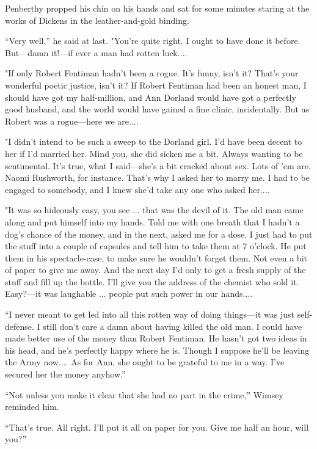 Penberthy propped his chin on his hands and sat for some minutes staring at the works of Dickens in the leather-and-gold binding.

\enquote{Very well,} he said at last. "You're quite right. I ought to have done it before. But\allowbreak---\allowbreak damn it!---if ever a man had rotten luck....

"If only Robert Fentiman hadn't been a rogue. It's funny, isn't it? That's your wonderful poetic justice, isn't it? If Robert Fentiman had been an honest man, I should have got my half-million, and Ann Dorland would have got a perfectly good husband, and the world would have gained a fine clinic, incidentally. But as Robert was a rogue\allowbreak---\allowbreak here we are....

"I didn't intend to be such a sweep to the Dorland girl. I'd have been decent to her if I'd married her. Mind you, she did sicken me a bit. Always wanting to be sentimental. It's true, what I said\allowbreak---\allowbreak she's a bit cracked about sex. Lots of 'em are. Naomi Rushworth, for instance. That's why I asked her to marry me. I had to be engaged to somebody, and I knew she'd take any one who asked her....

"It was so hideously easy, you see ... that was the devil of it. The old man came along and put himself into my hands. Told me with one breath that I hadn't a dog's chance of the money, and in the next, asked me for a dose. I just had to put the stuff into a couple of capsules and tell him to take them at 7 o'clock. He put them in his spectacle-case, to make sure he wouldn't forget them. Not even a bit of paper to give me away. And the next day I'd only to get a fresh supply of the stuff and fill up the bottle. I'll give you the address of the chemist who sold it. Easy?---it was laughable ... people put such power in our hands....

\enquote{I never meant to get led into all this rotten way of doing things\allowbreak---\allowbreak it was just self-defense. I still don't care a damn about having killed the old man. I could have made better use of the money than Robert Fentiman. He hasn't got two ideas in his head, and he's perfectly happy where he is. Though I suppose he'll be leaving the Army now.... As for Ann, she ought to be grateful to me in a way. I've secured her the money anyhow.}

\enquote{Not unless you make it clear that she had no part in the crime,} Wimsey reminded him.

\enquote{That's true. All right. I'll put it all on paper for you. Give me half an hour, will you?}

